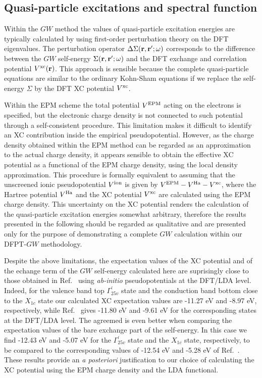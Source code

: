 \documentclass[twocolumn,prb,showpacs,superscriptaddress]{revtex4}
\def\w{\omega}
\def\r{{\bf r}}
\def\rp{{\bf r^\prime}}
\begin{document}
\subsection{Quasi-particle excitations and spectral function}\label{sec.5d}

Within the $GW$ method the values of quasi-particle excitation energies are typically 
calculated by using first-order perturbation theory on the DFT eigenvalues.\cite{hl86}
The perturbation operator $\Delta \Sigma(\r,\rp;\w)$ corresponds to the difference between 
the $GW$ self-energy $\Sigma(\r,\rp;\w)$ and the DFT exchange and correlation potential $V^{\rm xc}(\r)$.
This approach is sensible because the complete quasi-particle equations
are similar to the ordinary Kohn-Sham equations if we replace the self-energy $\Sigma$
by the DFT XC potential $V^{\rm xc}$.\cite{hl} 

Within the EPM scheme the total potential $V^{\rm EPM}$ acting on the electrons is specified,\cite{cohen_berg}
but the electronic charge density is not connected to such potential
through a self-consistent procedure.\cite{appelbaum}
This limitation makes it difficult to identify an XC contribution inside the empirical
pseudopotential. However, as the charge density obtained within the EPM method can be regarded 
as an approximation to the actual charge density,\cite{EPM-density}
it appears sensible to obtain the effective XC potential
as a functional of the EPM charge density,
using the local density approximation.\cite{lda1,lda2}
This procedure is formally equivalent to assuming that the unscreened ionic pseudopotential
$V^{\rm ion}$ is given by $V^{\rm EPM} - V^{\rm Ha} - V^{\rm xc}$, where
the Hartree potential $V^{\rm Ha}$ and the XC potential $V^{\rm xc}$ are calculated using the EPM charge density.
%
This uncertainty on the XC potential renders the calculation of the quasi-particle
excitation energies somewhat arbitrary, therefore the results presented in the following
should be regarded as qualitative and are presented only for the purpose of demonstrating 
a complete $GW$  calculation within our DFPT-$GW$ methodology.

Despite the above limitations, the expectation values of the
XC potential and of the echange term of the $GW$ self-energy calculated here are suprisingly
close to those obtained in Ref.\  using {\it ab-initio} pseudopotentials
at the DFT/LDA level. Indeed, for the valence band top 
$\Gamma_{25v}^\prime$ state and the conduction band bottom close to the $X_{1c}$ state
our calculated XC expectation values are -11.27 eV and -8.97 eV, respectively,
while Ref.\  gives -11.80 eV and -9.61 eV for the corresponding states
at the DFT/LDA level. The agreemed is even better when comparing the expectation values
of the bare exchange part of the self-energy. In this case we find -12.43 eV and -5.07 eV
for the $\Gamma_{25v}^\prime$ state and the $X_{1c}$ state, respectively, to be compared
to the corresponding values of -12.54 eV and -5.28 eV of Ref.~.
These results provide an {\it a posteriori} justification to our choice of calculating
the XC potential using the EPM charge density and the LDA functional.
\end{document}

